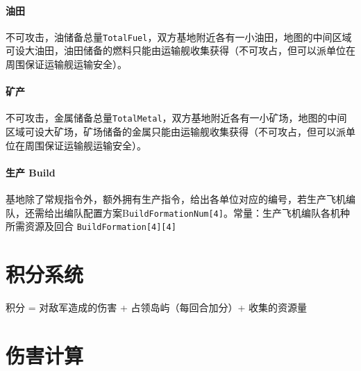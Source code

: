 \documentclass[11pt,a4paper]{article}
\begin{document}
    \paragraph{油田}
      不可攻击，油储备总量\texttt{TotalFuel}，双方基地附近各有一小油田，地图的中间区域可设大油田，油田储备的燃料只能由运输舰收集获得（不可攻占，但可以派单位在周围保证运输舰运输安全）。

    \paragraph{矿产}
      不可攻击，金属储备总量\texttt{TotalMetal}，双方基地附近各有一小矿场，地图的中间区域可设大矿场，矿场储备的金属只能由运输舰收集获得（不可攻占，但可以派单位在周围保证运输舰运输安全）。

    \paragraph{生产 Build}
      基地除了常规指令外，额外拥有生产指令，给出各单位对应的编号，若生产飞机编队，还需给出编队配置方案B\texttt{uildFormationNum[4]}。常量：生产飞机编队各机种所需资源及回合 \texttt{BuildFormation[4][4]}


  \section{积分系统}
  \label{sec:score-system}
    积分 = 对敌军造成的伤害 + 占领岛屿（每回合加分）+ 收集的资源量


  \section{伤害计算}
\end{document}
